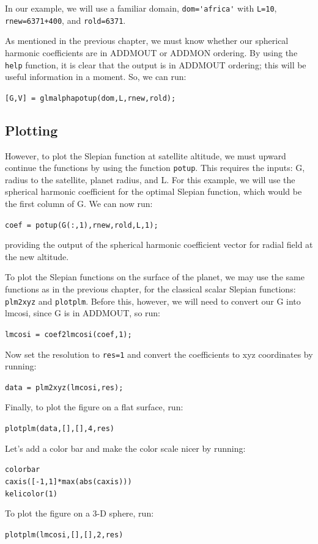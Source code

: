\documentclass[11pt]{article}
\begin{document}
In our example, we will use a familiar domain, \verb+dom='africa'+ with \verb+L=10+, \verb|rnew=6371+400|, and \verb+rold=6371+.  

As mentioned in the previous chapter, we must know whether our spherical harmonic coefficients are in ADDMOUT or ADDMON ordering.  By using the \verb+help+ function, it is clear that the output is in ADDMOUT ordering; this will be useful information in a moment.  So, we can run:

\verb+[G,V] = glmalphapotup(dom,L,rnew,rold);+

\subsection{Plotting}
However, to plot the Slepian function at satellite altitude, we must upward continue the functions by using the function \verb+potup+.  This requires the inputs: G, radius to the satellite, planet radius, and L.  For this example, we will use the spherical harmonic coefficient for the optimal Slepian function, which would be the first column of G.  We can now run:

\verb+coef = potup(G(:,1),rnew,rold,L,1);+

providing the output of the spherical harmonic coefficient vector for radial field at the new altitude.

To plot the Slepian functions on the surface of the planet, we may use the same functions as in the previous chapter, for the classical scalar Slepian functions: \verb+plm2xyz+ and \verb+plotplm+.  Before this, however, we will need to convert our G into lmcosi, since G is in ADDMOUT, so run:

\verb+lmcosi = coef2lmcosi(coef,1);+

Now set the resolution to \verb+res=1+ and convert the coefficients to xyz coordinates by running:

\verb+data = plm2xyz(lmcosi,res);+

Finally, to plot the figure on a flat surface, run:

\verb+plotplm(data,[],[],4,res)+

Let's add a color bar and make the color scale nicer by running:

\verb+colorbar+\\
\verb+caxis([-1,1]*max(abs(caxis)))+\\
\verb+kelicolor(1)+

To plot the figure on a 3-D sphere, run:

\verb+plotplm(lmcosi,[],[],2,res)+
\end{document}
